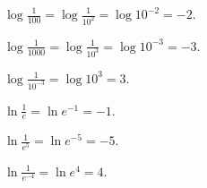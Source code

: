 \begin{alist}
\item $ \log{\frac{1}{100}}=\log{\frac{1}{10^2}}=\log{10^{-2}}=-2 $.
\item $ \log{\frac{1}{1000}}=\log{\frac{1}{10^3}}=\log{10^{-3}}=-3 $.
\item $ \log{\frac{1}{10^{-3}}}=\log{10^3}=3 $.
\item $ \ln{\frac{1}{e}}=\ln{e^{-1}}=-1 $.
\item $ \ln{\frac{1}{e^5}}=\ln{e^{-5}}=-5 $.
\item $ \ln{\frac{1}{e^{-4}}}=\ln{e^4}=4 $.
\end{alist}
